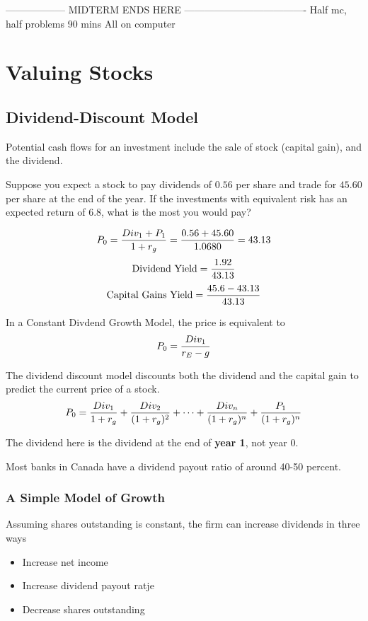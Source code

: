 \documentclass[english, 12pt]{article}
\begin{document}
------------------ MIDTERM ENDS HERE -------------------------------------
Half mc, half problems
90 mins
All on computer
\section{Valuing Stocks}

\subsection{Dividend-Discount Model}
Potential cash flows for an investment include the sale of stock (capital gain), and the dividend.

\begin{exmp}
Suppose you expect a stock to pay dividends of $0.56$ per share and trade for $45.60$ per share at the end of the year. If the investments with equivalent risk has an expected return of $6.8$, what is the most you would pay?
\begin{sol}
\[P_{0} = \frac{Div_{1} + P_{1}}{1 + r_{g}} = \frac{0.56 + 45.60}{1.0680} = 43.13\]
\[\text{Dividend Yield} = \frac{1.92}{43.13}\]
\[\text{Capital Gains Yield} = \frac{45.6 - 43.13}{43.13}\]
\end{sol}
\end{exmp}

\begin{defn}
In a Constant Divdend Growth Model, the price is equivalent to
\[P_{0} = \frac{Div_{1}}{r_{E} - g}\]
\end{defn}

\begin{defn}
The dividend discount model discounts both the dividend and the capital gain to predict the current price of a stock.
\[P_{0} = \frac{Div_{1}}{1 + r_{g}} + \frac{Div_{2}}{(1 + r_{g})^2} + \cdots + \frac{Div_{n}}{(1 + r_{g})^n} + \frac{P_{1}}{(1 + r_{g})^n}\]
\begin{note}
The dividend here is the dividend at the end of \textbf{year 1}, not year 0.
\end{note}
\end{defn}

\begin{qte}
Most banks in Canada have a dividend payout ratio of around 40-50 percent.
\end{qte}

\subsubsection*{A Simple Model of Growth}
Assuming shares outstanding is constant, the firm can increase dividends in three ways
\begin{itemize}
\item Increase net income
\item Increase dividend payout ratje
\item Decrease shares outstanding
\end{itemize}
\end{document}
